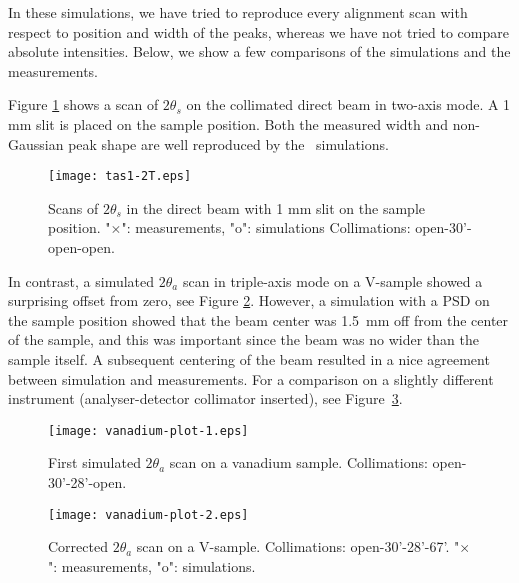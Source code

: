 In these simulations, we have tried to reproduce
every alignment scan with respect to position and width
of the peaks, whereas we have not tried to compare
absolute intensities. Below, we show a few comparisons 
of the simulations and the measurements. 

Figure \ref{f:2t_direct} shows a scan of 
$2\theta_s$ on the collimated direct beam in two-axis mode.
A 1 mm slit is placed on the sample position.
Both the measured width and non-Gaussian peak shape
are well reproduced by the \MCS\ simulations.

\begin{figure}
  \begin{center}
    \texttt{[image: tas1-2T.eps]}
  \end{center}
\caption{Scans of $2\theta_s$ in the direct beam with 1 mm slit on the
  sample position.
"$\times$": measurements, "o": simulations  
Collimations: open-30'-open-open.}
\label{f:2t_direct}
\end{figure}

In contrast, a simulated $2\theta_a$ scan in triple-axis 
mode on a V-sample showed a surprising offset from zero, see
Figure \ref{f:v_2ta_offset}. However, a simulation with a PSD
on the sample position showed that the beam center was 1.5~mm
off from the center of the sample, and this was important
since the beam was no wider than the sample itself.
A subsequent centering of the beam resulted in a nice
agreement between simulation and measurements. 
For a comparison on a slightly different instrument
(analyser-detector collimator inserted), 
see Figure~\ref{f:v_2ta_zero}.

\begin{figure}
  \begin{center}
    \texttt{[image: vanadium-plot-1.eps]}
  \end{center}
\caption{First simulated $2\theta_a$ scan on a vanadium sample.
Collimations: open-30'-28'-open.}
\label{f:v_2ta_offset}
\end{figure}

\begin{figure}
  \begin{center}
    \texttt{[image: vanadium-plot-2.eps]}
  \end{center}
\caption{Corrected $2\theta_a$ scan on a V-sample.
Collimations: open-30'-28'-67'.
"$\times$": measurements, "o": simulations.}
\label{f:v_2ta_zero}
\end{figure}

